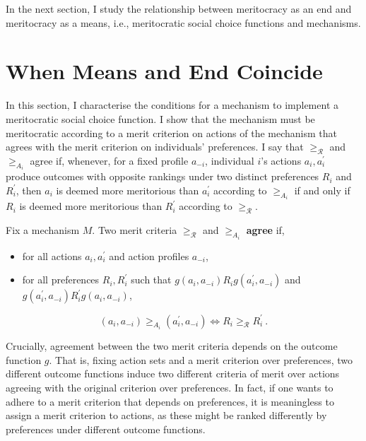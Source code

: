 In the next section, I study the relationship between meritocracy as an end and meritocracy as a means, i.e., meritocratic social choice functions and mechanisms.

\section{When Means and End Coincide}\label{sec:agree}

In this section, I characterise the conditions for a mechanism to implement a meritocratic social choice function. I show that the mechanism must be meritocratic according to a merit criterion on actions of the mechanism that agrees with the merit criterion on individuals' preferences. I say that \( \geq_{\mathcal{R}} \) and \( \geq_{A_i} \) agree if, whenever, for a fixed profile \( a_{-i} \), individual \( i \)'s actions \( a_i, a_i^{\prime} \) produce outcomes with opposite rankings under two distinct preferences  \( R_i \) and \( R_i^{\prime} \), then \( a_i \) is deemed more meritorious than \( a_i^{\prime} \) according to \( \geq_{A_i} \) if and only if \( R_i \) is deemed more meritorious than \( R_i^{\prime} \) according to \( \geq_{\mathcal{R}} \).

\begin{definition}
	Fix a mechanism \( M \). Two merit criteria \( \geq_{\mathcal{R}} \) and \( \geq_{A_i} \) \textbf{agree} if,
	\begin{itemize}
		\item for all actions \( a_i, a^{\prime}_{i} \) and action profiles \( a_{-i} \),
		\item for all preferences \( R_i, R^{\prime}_i \) such that \( g ( a_{i}, a_{-i} ) R_i g ( a^{\prime}_{i}, a_{-i} ) \) and \( g ( a^{\prime}_{i}, a_{-i} ) R^{\prime}_i g ( a_{i}, a_{-i} ) \),
	\end{itemize}

	\[ ( a_i, a_{-i} ) \geq_{A_i} ( a^{\prime}_i, a_{-i} ) \iff R_i \geq_{\mathcal{R}} R^{\prime}_i \: . \]
\end{definition}

Crucially, agreement between the two merit criteria depends on the outcome function \( g \). That is, fixing action sets and a merit criterion over preferences, two different outcome functions induce two different criteria of merit over actions agreeing with the original criterion over preferences. In fact, if one wants to adhere to a merit criterion that depends on preferences, it is meaningless to assign a merit criterion to actions, as these might be ranked differently by preferences under different outcome functions.

